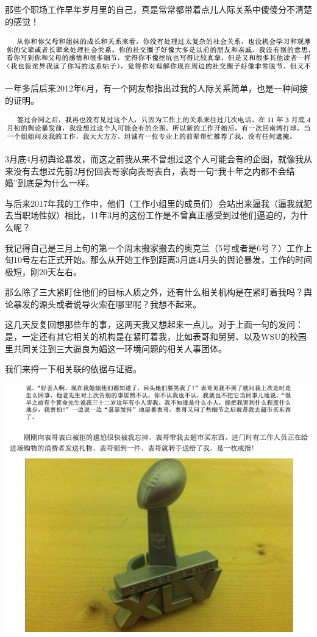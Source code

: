 \documentclass[9pt, b5paper]{article}
\begin{document}
那些个职场工作早年岁月里的自己，真是常常都带着点儿人际关系中傻傻分不清楚的感觉！

\begin{center}
\includegraphics[width=.9\linewidth]{./pic/backups_plans_20210412_114502.png}
\end{center}

一年多后后来2012年6月，有一个网友帮指出过我的人际关系简单，也是一种间接的证明。 

\begin{center}
\includegraphics[width=.9\linewidth]{./pic/backups_plans_20210412_104824.png}
\end{center}

3月底4月初舆论暴发，而这之前我从来不曾想过这个人可能会有的企图，就像我从来没有去想过先前2月份回表哥家向表哥表白，表哥一句“我十年之内都不会结婚”到底是为什么一样。 

与后来2017年我的工作中，他们（工作小组里的成员们）会站出来逼我（逼我就犯去当职场性奴）相比，11年3月的这份工作是不曾真正感受到过他们逼迫的，为什么呢？

我记得自己是三月上旬的第一个周末搬家搬去的奥克兰（5号或者是6号？）工作上旬10号左右正式开始。那么从开始工作到距离3月底4月头的舆论暴发，工作的时间极短，刚20天左右。

那么除了三大紧盯住他们的目标人质之外，还有什么相关机构是在紧盯着我吗？舆论暴发的源头或者说导火索在哪里呢？我想不起来。 

这几天反复回想那些年的事，这两天我又想起来一点儿。对于上面一句的发问：是，一定还有其它相关的机构是在紧盯着我，比如表哥和舅舅、以及WSU的校园里共同关注到三大逼良为娼这一环境问题的相关人事团体。

我们来捋一下相关联的依据与证据。

\begin{center}
\includegraphics[width=.9\linewidth]{./pic/backups_plans_20210414_103205.png}
\end{center}
\end{document}
